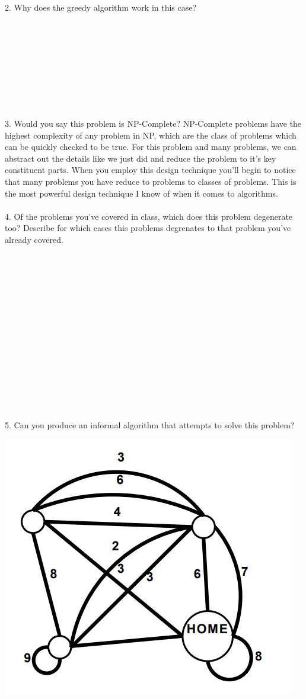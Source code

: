\documentclass[12pt]{article}
\begin{document}
2. Why does the greedy algorithm work in this case?\\\\\\\\\\\\\\\\\\\\
3. Would you say this problem is NP-Complete? NP-Complete problems have the 
highest complexity of any problem in NP, which are the class of problems which can
be quickly checked to be true.
\newpage
\noindent For this problem and many problems, we can abstract out the details like we just did
and reduce the problem to it's key constituent parts. When you employ this
design technique you'll begin to notice that many problems you have reduce to problems
to classes of problems. This is the most powerful design technique I know of when it 
comes to algorithms.\\\\
4. Of the problems you've covered in class, which does this problem degenerate too? Describe for 
which cases this problems degrenates to that problem you've already covered.\\\\\\\\\\\\\\\\\\\\\\\\\\\\\\\\
5. Can you produce an informal algorithm that attempts to solve this problem?
\newpage
\centerline{\includegraphics[scale = .45]{jogger.jpg}}
\end{document}
